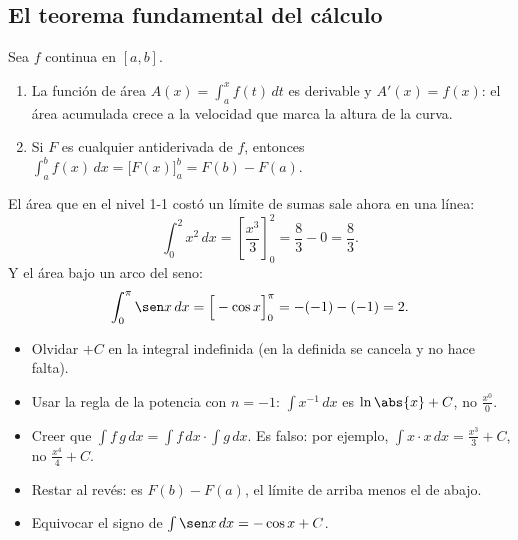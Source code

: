 \documentclass[11pt,a4paper]{article}
\newcommand{\dx}{\,dx}
\begin{document}
\subsection{El teorema fundamental del cálculo}
\begin{propiedad}
Sea $f$ continua en $[a,b]$.
\begin{enumerate}[label=\textbf{\arabic*.},leftmargin=1.6em]
\item La función de área $A(x)=\displaystyle\int_a^x f(t)\,dt$ es derivable y $A'(x)=f(x)$: el área acumulada crece
      a la velocidad que marca la altura de la curva.
\item Si $F$ es cualquier antiderivada de $f$, entonces
      $\displaystyle\int_a^b f(x)\dx=\Big[F(x)\Big]_a^b=F(b)-F(a).$
\end{enumerate}
\end{propiedad}
\begin{minipage}[c]{0.52\linewidth}
\begin{ejemplo}
El área que en el nivel 1-1 costó un límite de sumas sale ahora en una línea:
\[ \int_0^2x^{2}\dx=\left[\frac{x^{3}}{3}\right]_0^2=\frac83-0=\frac83. \]
Y el área bajo un arco del seno:
\[ \int_0^{\pi}\sen x\dx=\Big[-\cos x\Big]_0^{\pi}=-(-1)-(-1)=2. \]
\end{ejemplo}
\end{minipage}\hfill
\begin{minipage}[c]{0.44\linewidth}\centering
{}
\end{minipage}

\begin{ojo}
\begin{itemize}
\item Olvidar $+C$ en la integral indefinida (en la definida se cancela y no hace falta).
\item Usar la regla de la potencia con $n=-1$: $\int x^{-1}\dx$ es $\ln\abs{x}+C$, no $\frac{x^0}{0}$.
\item Creer que $\int f\,g\dx=\int f\dx\cdot\int g\dx$. Es falso: por ejemplo, $\int x\cdot x\dx=\frac{x^3}{3}+C$, no $\frac{x^4}{4}+C$.
\item Restar al revés: es $F(b)-F(a)$, el límite de arriba menos el de abajo.
\item Equivocar el signo de $\int\sen x\dx=-\cos x+C$.
\end{itemize}
\end{ojo}
\end{document}
